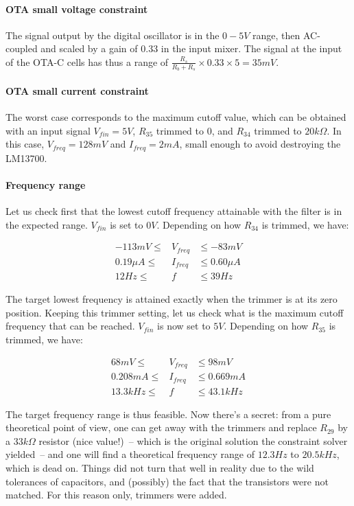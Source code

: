 \documentclass[a4paper,11pt]{article}
\begin{document}
\paragraph{OTA small voltage constraint} The signal output by the digital oscillator is in the $0-5V$ range, then AC-coupled and scaled by a gain of $0.33$ in the input mixer. The signal at the input of the OTA-C cells has thus a range of $\frac{R_s}{R_b + R_s} \times 0.33 \times 5 = 35mV$.

\paragraph{OTA small current constraint} The worst case corresponds to the maximum cutoff value, which can be obtained with an input signal $V_{fin} = 5V$, $R_{35}$ trimmed to 0, and $R_{34}$ trimmed to $20k\Omega$. In this case, $V_{freq} = 128mV$ and $I_{freq} = 2mA$, small enough to avoid destroying the LM13700.

\paragraph{Frequency range} Let us check first that the lowest cutoff frequency attainable with the filter is in the expected range. $V_{fin}$ is set to $0V$. Depending on how $R_{34}$ is trimmed, we have:

\begin{eqnarray}
-113mV \leq &V_{freq}& \leq -83mV \\
0.19\mu A \leq &I_{freq}& \leq 0.60\mu A \\
12Hz \leq &f& \leq 39Hz
\end{eqnarray}

The target lowest frequency is attained exactly when the trimmer is at its zero position. Keeping this trimmer setting, let us check what is the maximum cutoff frequency that can be reached. $V_{fin}$ is now set to $5V$. Depending on how $R_{35}$ is trimmed, we have:

\begin{eqnarray}
68mV \leq &V_{freq}& \leq 98mV \\
0.208 mA \leq &I_{freq}& \leq 0.669 mA \\
13.3kHz \leq &f& \leq 43.1kHz
\end{eqnarray}

The target frequency range is thus feasible. Now there's a secret: from a pure theoretical point of view, one can get away with the trimmers and replace $R_{29}$ by a $33k\Omega$ resistor (nice value!)~-- which is the original solution the constraint solver yielded~-- and one will find a theoretical frequency range of $12.3 Hz$ to $20.5kHz$, which is dead on. Things did not turn that well in reality due to the wild tolerances of capacitors, and (possibly) the fact that the transistors were not matched. For this reason only, trimmers were added.
\end{document}

